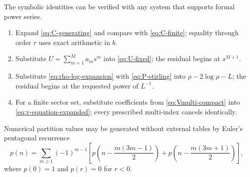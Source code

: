 \documentclass[11pt,a4paper]{article}
\numberwithin{equation}{section}
\theoremstyle{definition}
\theoremstyle{remark}
\begin{document}
The symbolic identities can be verified with any system that supports formal
power series.
\begin{enumerate}[label=\arabic*.]
\item Expand \eqref{eq:C-generating} and compare with
      \eqref{eq:C-finite}; equality through order $r$ uses exact arithmetic in
      $b$.
\item Substitute $U=\sum_{m=1}^Ma_ms^m$ into \eqref{eq:U-fixed}; the residual
      begins at $s^{M+1}$.
\item Substitute \eqref{eq:rho-log-expansion} with \eqref{eq:P-stirling} into
      $\rho-2\log\rho-L$; the residual begins at the requested power of $L^{-1}$.
\item For a finite sector set, substitute coefficients from
      \eqref{eq:Vmulti-compact} into \eqref{eq:v-equation-expanded}; every
      prescribed multi-index cancels identically.
\end{enumerate}
Numerical partition values may be generated without external tables by Euler's
pentagonal recurrence
\begin{equation}\label{eq:pentagonal-recurrence}
 p(n)=\sum_{m\geq1}(-1)^{m-1}
 \left[p\!\left(n-\frac{m(3m-1)}2\right)
      +p\!\left(n-\frac{m(3m+1)}2\right)\right],
\end{equation}
where $p(0)=1$ and $p(r)=0$ for $r<0$.
\end{document}
